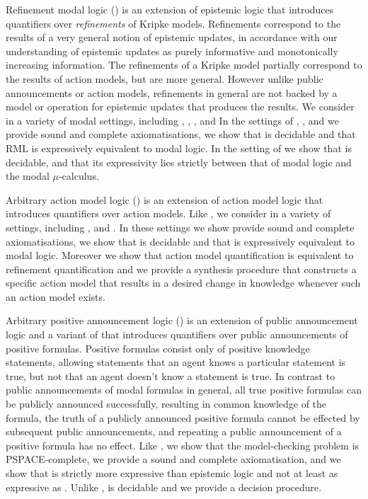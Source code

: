 Refinement modal logic (\logicRml{}) is an extension of epistemic logic that introduces quantifiers over {\em refinements} of Kripke models.
Refinements correspond to the results of a very general notion of epistemic updates, in accordance with our understanding of epistemic updates as purely informative and monotonically increasing information.
The refinements of a Kripke model partially correspond to the results of action models, but are more general.
However unlike public announcements or action models, refinements in general are not backed by a model or operation for epistemic updates that produces the results.
We consider \logicRml{} in a variety of modal settings, including \classK{}, \classKF{}, \classKFF{}, \classKD{} and \classS{}
In the settings of \classK{}, \classKFF{}, \classKD{} and \classS{} we provide sound and complete axiomatisations, we show that \logicRml{} is decidable and that RML is expressively equivalent to modal logic.
In the setting of \classKF{} we show that \logicRml{} is decidable, and that its expressivity lies strictly between that of modal logic and the modal $\mu$-calculus.

Arbitrary action model logic (\logicAaml{}) is an extension of action model logic that introduces quantifiers over action models.
Like \logicRml{}, we consider \logicAaml{} in a variety of settings, including \classK{}, \classKFF{} and \classS{}.
In these settings we show provide sound and complete axiomatisations, we show that \logicAaml{} is decidable and that \logicAaml{} is expressively equivalent to modal logic.
Moreover we show that action model quantification is equivalent to refinement quantification and we provide a synthesis procedure that constructs a specific action model that results in a desired change in knowledge whenever such an action model exists.

Arbitrary positive announcement logic (\logicPapal{}) is an extension of public announcement logic and a variant of \logicApal{} that introduces quantifiers over public announcements of positive formulas.
Positive formulas consist only of positive knowledge statements, allowing statements that an agent knows a particular statement is true, but not that an agent doesn't know a statement is true.
In contrast to public announcements of modal formulas in general, all true positive formulas can be publicly announced successfully, resulting in common knowledge of the formula, the truth of a publicly announced positive formula cannot be effected by subsequent public announcements, and repeating a public announcement of a positive formula has no effect.
Like \logicApal{}, we show that the model-checking problem is PSPACE-complete, we provide a sound and complete axiomatisation, and we show that \logicPapal{} is strictly more expressive than epistemic logic and not at least as expressive as \logicApal{}.
Unlike \logicApal{}, \logicPapal{} is decidable and we provide a decision procedure.


